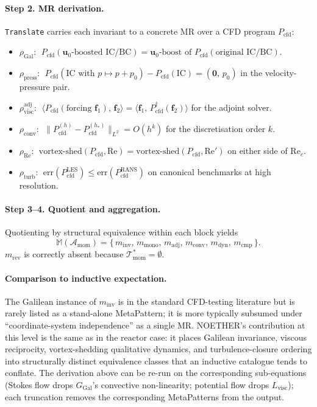 \paragraph{Step 2. MR derivation.} \texttt{Translate} carries each invariant to a concrete MR over a CFD program $P_{\mathrm{cfd}}$:
\begin{itemize}
    \item $\rho_{\mathrm{Gal}}$: $\;P_{\mathrm{cfd}}(\mathbf{u}_0\text{-boosted IC/BC}) = \mathbf{u}_0\text{-boost of } P_{\mathrm{cfd}}(\text{original IC/BC})$.
    \item $\rho_{\mathrm{press}}$: $\;P_{\mathrm{cfd}}(\text{IC with } p \mapsto p + p_0) - P_{\mathrm{cfd}}(\text{IC}) = (\mathbf{0},\,p_0)$ in the velocity-pressure pair.
    \item $\rho_{\mathrm{visc}}^{\mathrm{adj}}$: $\;\langle P_{\mathrm{cfd}}(\text{forcing }\mathbf{f}_1),\,\mathbf{f}_2\rangle = \langle \mathbf{f}_1,\,P_{\mathrm{cfd}}^{\dagger}(\mathbf{f}_2)\rangle$ for the adjoint solver.
    \item $\rho_{\mathrm{conv}}$: $\;\|P_{\mathrm{cfd}}^{(h)} - P_{\mathrm{cfd}}^{(h_*)}\|_{L^2} = O(h^k)$ for the discretisation order $k$.
    \item $\rho_{\mathrm{Re}}$: $\;\mathrm{vortex\text{-}shed}(P_{\mathrm{cfd}}, \mathrm{Re}) = \mathrm{vortex\text{-}shed}(P_{\mathrm{cfd}}, \mathrm{Re}')$ on either side of $\mathrm{Re}_c$.
    \item $\rho_{\mathrm{turb}}$: $\;\mathrm{err}(P_{\mathrm{cfd}}^{\mathrm{LES}}) \le \mathrm{err}(P_{\mathrm{cfd}}^{\mathrm{RANS}})$ on canonical benchmarks at high resolution.
\end{itemize}

\paragraph{Step 3--4. Quotient and aggregation.} Quotienting by structural equivalence within each block yields
$$
\mathbb{M}(\mathcal{A}_{\mathrm{mom}}) = \{\,m_{\mathrm{inv}},\, m_{\mathrm{mono}},\, m_{\mathrm{adj}},\, m_{\mathrm{conv}},\, m_{\mathrm{dyn}},\, m_{\mathrm{cmp}}\,\}.
$$
$m_{\mathrm{rev}}$ is correctly absent because $\mathcal{T}^{*}_{\mathrm{mom}} = \emptyset$.

\paragraph{Comparison to inductive expectation.} The Galilean instance of $m_{\mathrm{inv}}$ is in the standard CFD-testing literature but is rarely listed as a stand-alone MetaPattern; it is more typically subsumed under ``coordinate-system independence'' as a single MR. NOETHER's contribution at this level is the same as in the reactor case: it places Galilean invariance, viscous reciprocity, vortex-shedding qualitative dynamics, and turbulence-closure ordering into structurally distinct equivalence classes that an inductive catalogue tends to conflate. The derivation above can be re-run on the corresponding sub-equations (Stokes flow drops $G_{\mathrm{Gal}}$'s convective non-linearity; potential flow drops $L_{\mathrm{visc}}$); each truncation removes the corresponding MetaPatterns from the output.

